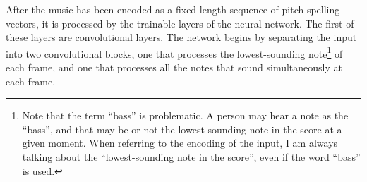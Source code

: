 
After the music has been encoded as a fixed-length sequence
of pitch-spelling vectors, it is processed by the trainable
layers of the neural network. The first of these layers are
convolutional layers. The network begins by separating the
input into two convolutional blocks, one that processes the
lowest-sounding note\footnote{Note that the term ``bass'' is
problematic. A person may hear a note as the ``bass'', and
that may be or not the lowest-sounding note in the score at
a given moment. When referring to the encoding of the input,
I am always talking about the ``lowest-sounding note in the
score'', even if the word ``bass'' is used.} of each
\gls{frame}, and one that processes all the notes that sound
simultaneously at each frame.
